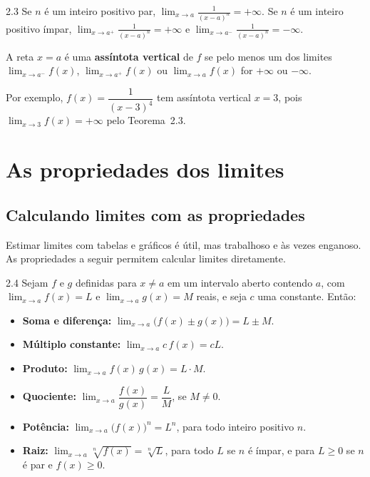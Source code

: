 \begin{teorema}{2.3}
Se $n$ é um inteiro positivo par, $\displaystyle\lim_{x\to a}\frac{1}{(x-a)^n}=+\infty$.
Se $n$ é um inteiro positivo ímpar,
$\displaystyle\lim_{x\to a^+}\frac{1}{(x-a)^n}=+\infty$ e
$\displaystyle\lim_{x\to a^-}\frac{1}{(x-a)^n}=-\infty$.
\end{teorema}

\begin{definicao}
A reta $x=a$ é uma \textbf{assíntota vertical} de $f$ se pelo menos um dos limites
$\lim_{x\to a^-}f(x)$, $\lim_{x\to a^+}f(x)$ ou $\lim_{x\to a}f(x)$ for $+\infty$ ou
$-\infty$.
\end{definicao}

Por exemplo, $f(x)=\dfrac{1}{(x-3)^4}$ tem assíntota vertical $x=3$, pois
$\lim_{x\to3}f(x)=+\infty$ pelo Teorema~2.3.

\section{As propriedades dos limites}

\subsection{Calculando limites com as propriedades}

Estimar limites com tabelas e gráficos é útil, mas trabalhoso e às vezes enganoso. As
propriedades a seguir permitem calcular limites diretamente.

\begin{teorema}{2.4}
Sejam $f$ e $g$ definidas para $x\neq a$ em um intervalo aberto contendo $a$, com
$\lim_{x\to a}f(x)=L$ e $\lim_{x\to a}g(x)=M$ reais, e seja $c$ uma constante. Então:
\begin{itemize}
\item \textbf{Soma e diferença:} $\lim_{x\to a}\big(f(x)\pm g(x)\big)=L\pm M$.
\item \textbf{Múltiplo constante:} $\lim_{x\to a}c\,f(x)=cL$.
\item \textbf{Produto:} $\lim_{x\to a}f(x)\,g(x)=L\cdot M$.
\item \textbf{Quociente:} $\lim_{x\to a}\dfrac{f(x)}{g(x)}=\dfrac LM$, se $M\neq0$.
\item \textbf{Potência:} $\lim_{x\to a}\big(f(x)\big)^n=L^n$, para todo inteiro positivo $n$.
\item \textbf{Raiz:} $\lim_{x\to a}\sqrt[n]{f(x)}=\sqrt[n]{L}$, para todo $L$ se $n$ é ímpar,
  e para $L\ge0$ se $n$ é par e $f(x)\ge0$.
\end{itemize}
\end{teorema}

